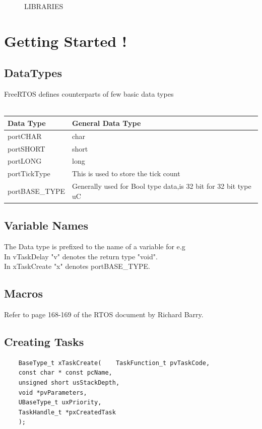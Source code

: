 \documentclass[11pt,a4paper]{book}
\begin{document}
\begin{enumerate}
\begin{itemize}
\begin{figure}[H]
	\caption{LIBRARIES}
\end{figure}

\end{itemize}

\end{enumerate}
\section{Getting Started !}

	\subsection{DataTypes}
		FreeRTOS defines counterparts of few basic data types
		\\
		\\
\begin{tabular}{|l|l|}
	\hline
	\textbf{Data Type }&\textbf{General Data Type}\\
	 \hline
	 	portCHAR&char\\ \hline
		portSHORT&short\\ \hline
		portLONG&long\\ \hline
		portTickType&This is used to store the tick count\\ \hline
		portBASE\_TYPE&Generally used for Bool type data,is 32 bit for 32 bit type uC\\ \hline
\end{tabular}

	\subsection{Variable Names}
	The Data type is prefixed to the name of a variable for e.g \\
	
	In vTaskDelay "v" denotes the return type "void".\\
	
	In xTaskCreate "x" denotes portBASE\_TYPE.
	
	\subsection{Macros}
	Refer to page 168-169 of the RTOS document by Richard Barry.
	
	\subsection{Creating Tasks}
	
	\begin{lstlisting}
	BaseType_t xTaskCreate(    TaskFunction_t pvTaskCode,
	const char * const pcName,
	unsigned short usStackDepth,
	void *pvParameters,
	UBaseType_t uxPriority,
	TaskHandle_t *pxCreatedTask
	);
	\end{lstlisting}
	
\end{document}
